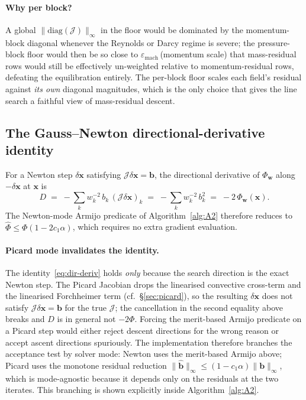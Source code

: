 \documentclass{article}
\begin{document}
\paragraph{Why per block?}  A global $\|\mathrm{diag}(\mathcal{J})\|_\infty$
in the floor would be dominated by the momentum-block diagonal whenever
the Reynolds or Darcy regime is severe; the pressure-block floor
would then be so close to $\varepsilon_{\mathrm{mach}}\,$(momentum scale)
that mass-residual rows would still be effectively un-weighted relative
to momentum-residual rows, defeating the equilibration entirely. The
per-block floor scales each field's residual against \emph{its own}
diagonal magnitudes, which is the only choice that gives the line search
a faithful view of mass-residual descent.

\subsection{The Gauss--Newton directional-derivative identity}
\label{sec:dir-deriv}

For a Newton step $\delta\boldsymbol{x}$ satisfying
$\mathcal{J}\delta\boldsymbol{x} = \boldsymbol{b}$, the directional
derivative of $\Phi_{\boldsymbol{w}}$ along $-\delta\boldsymbol{x}$ at
$\boldsymbol{x}$ is
\begin{equation}
    \label{eq:dir-deriv}
    D \;=\; -\sum_k w_k^{-2}\, b_k\,(\mathcal{J}\delta\boldsymbol{x})_k
        \;=\; -\sum_k w_k^{-2}\, b_k^2
        \;=\; -2\,\Phi_{\boldsymbol{w}}(\boldsymbol{x}).
\end{equation}
The Newton-mode Armijo predicate of Algorithm~\ref{alg:A2} therefore
reduces to $\hat\Phi \le \Phi(1 - 2 c_1 \alpha)$, which requires no extra
gradient evaluation.

\paragraph{Picard mode invalidates the identity.}  The identity~\eqref{eq:dir-deriv}
holds \emph{only} because the search direction is the exact Newton step.
The Picard Jacobian drops the linearised convective cross-term and the
linearised Forchheimer term (cf.\ §\ref{sec:picard}), so the resulting
$\delta\boldsymbol{x}$ does not satisfy $\mathcal{J}\delta\boldsymbol{x}
= \boldsymbol{b}$ for the true $\mathcal{J}$; the cancellation in the
second equality above breaks and $D$ is in general not $-2\Phi$. Forcing
the merit-based Armijo predicate on a Picard step would either reject
descent directions for the wrong reason or accept ascent directions
spuriously. The implementation therefore branches the acceptance test by
solver mode: Newton uses the merit-based Armijo above; Picard uses the
monotone residual reduction
$\|\hat{\boldsymbol{b}}\|_\infty \le (1 - c_1 \alpha)\|\boldsymbol{b}\|_\infty$,
which is mode-agnostic because it depends only on the residuals at the
two iterates. This branching is shown explicitly inside
Algorithm~\ref{alg:A2}.
\end{document}
